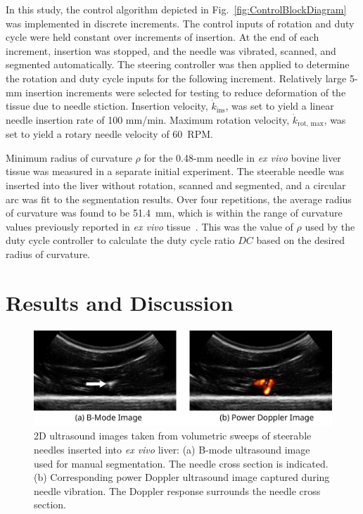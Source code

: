 In this study, the control algorithm depicted in Fig.~\ref{fig:ControlBlockDiagram} was implemented in discrete increments. The control inputs of rotation and duty cycle were held constant over increments of insertion. At the end of each increment, insertion was stopped, and the needle was vibrated, scanned, and segmented automatically. The steering controller was then applied to determine the rotation and duty cycle inputs for the following increment. Relatively large 5-mm insertion increments were selected for testing to reduce deformation of the tissue due to needle stiction. Insertion velocity, $\dot{k}_\text{ins}$, was set to yield a linear needle insertion rate of 100 mm/min. Maximum rotation velocity, $\dot{k}_\text{rot, max}$, was set to yield a rotary needle velocity of 60~RPM.

Minimum radius of curvature $\rho$ for the 0.48-mm needle in \textit{ex vivo} bovine liver tissue was measured in a separate initial experiment. The steerable needle was inserted into the liver without rotation, scanned and segmented, and a circular arc was fit to the segmentation results. Over four repetitions, the average radius of curvature was found to be 51.4~mm, which is within the range of curvature values previously reported in \textit{ex vivo} tissue~\cite{Majewicz2012}. This was the value of $\rho$ used by the duty cycle controller to calculate the duty cycle ratio $DC$ based on the desired radius of curvature.
 
\section{Results and Discussion}
\begin{figure}[!t]
\centering
\includegraphics[width=\textwidth]{Images/Chapter2/2DUS/2DUS}%
\caption[2D ultrasound images from 3D sweeps of needle]{2D ultrasound images taken from volumetric sweeps of steerable needles inserted into \textit{ex vivo} liver: (a) B-mode ultrasound image used for manual segmentation. The needle cross section is indicated. (b) Corresponding power Doppler ultrasound image captured during needle vibration. The Doppler response surrounds the needle cross section.}
\label{fig:2DUS}
\end{figure} 

